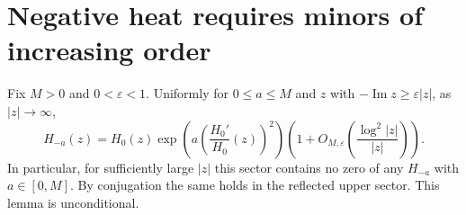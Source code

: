 \section{Negative heat requires minors of increasing order}
\label{sec:analytic-pf-order-escape}

\begin{lemma}
\label{lem:analytic-heat-angular}
Fix $M>0$ and $0<\varepsilon<1$. Uniformly for $0\le a\le M$ and
$z$ with $-\operatorname{Im}z\ge\varepsilon|z|$, as $|z|\to\infty$,
\begin{equation}\label{eq:analytic-angular-asymptotic}
 H_{-a}(z)=H_0(z)
   \exp\left(a\left(\frac{H_0'}{H_0}(z)\right)^2\right)
       \left(1+O_{M,\varepsilon}
              \left(\frac{\log^2|z|}{|z|}\right)\right).
\end{equation}
In particular, for sufficiently large $|z|$ this sector contains
no zero of any $H_{-a}$ with $a\in[0,M]$. By conjugation the same
holds in the reflected upper sector. This lemma is unconditional.
\end{lemma}

